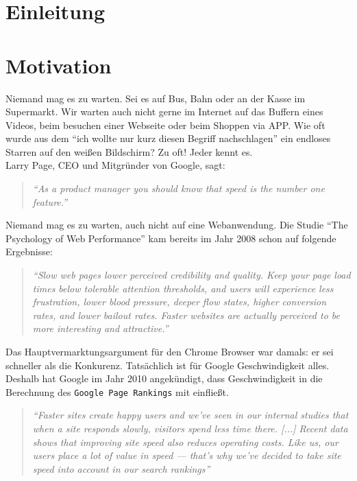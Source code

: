 \section{Einleitung} %
\label{sec:einleitung}



\section{Motivation} %
\label{sub:motivation}
	Niemand mag es zu warten. Sei es auf Bus, Bahn oder an der Kasse im Supermarkt. Wir warten auch nicht gerne im Internet auf das Buffern eines Videos, beim besuchen einer Webseite oder beim Shoppen via APP. Wie oft wurde aus dem "`ich wollte nur kurz diesen Begriff nachschlagen"' ein endloses Starren auf den weißen Bildschirm? Zu oft! Jeder kennt es.\\

	Larry Page, CEO und Mitgründer von Google, sagt:
	\begin{quote}
		\textit{"`As a product manager you should know that speed is the number one feature."'}\autocite{holzle10}
	\end{quote}
	Niemand mag es zu warten, auch nicht auf eine Webanwendung. Die Studie "`The Psychology of Web Performance"' kam bereits im Jahr 2008 schon auf folgende Ergebnisse:

	\begin{quote}\itshape
		"`Slow web pages lower perceived credibility and quality. Keep your page load times below tolerable attention thresholds, and users will experience less frustration, lower blood pressure, deeper flow states, higher conversion rates, and lower bailout rates. Faster websites are actually perceived to be more interesting and attractive."' \autocite{webOpti08}
	\end{quote}

	Das Hauptvermarktungsargument für den Chrome Browser war damals: er sei schneller als die Konkurenz. Tatsächlich ist für Google Geschwindigkeit alles. Deshalb hat Google im Jahr 2010 angekündigt, dass Geschwindigkeit in die Berechnung des \texttt{Google Page Rankings} mit einfließt.

	\begin{quote}\itshape
		"`Faster sites create happy users and we've seen in our internal studies that when a site responds slowly, visitors spend less time there. [...] Recent data shows that improving site speed also reduces operating costs. Like us, our users place a lot of value in speed — that's why we've decided to take site speed into account in our search rankings"'\autocite{google10}
	\end{quote}

